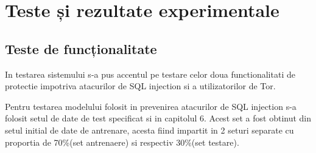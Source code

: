 
 \chapter{Teste și rezultate experimentale}
\label{cap:rezultate}

%
%
%

 \section{Teste de funcționalitate}
 
 In testarea sistemului s-a pus accentul pe testare celor doua functionalitati de protectie impotriva atacurilor de SQL injection si a utilizatorilor de Tor.
 
 Pentru testarea modelului folosit in prevenirea atacurilor de SQL injection s-a folosit setul de date de test specificat si in capitolul 6. Acest set a fost obtinut din setul initial de date de antrenare, acesta fiind impartit in 2 seturi separate cu proportia de 70\%(set antrenaere) si respectiv 30\%(set testare).
 
